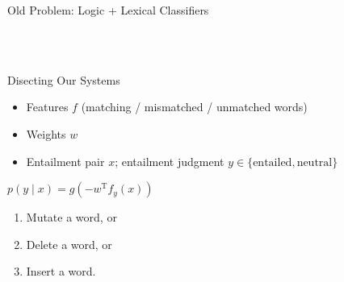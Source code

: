 \def\title{Old Problem: Logic + Lexical Classifiers}
\begin{frame}{\title}
\begin{center}
 \\
 \\
\vspace{2ex}
\end{center}
\end{frame}



\def\title{Disecting Our Systems}
\begin{frame}{\title}
\begin{itemize}
\item Features $f$ (matching / mismatched / unmatched words)
\item Weights $w$
\item Entailment pair $x$; entailment judgment $y \in \{\textrm{entailed}, \textrm{neutral}\}$
\end{itemize}

\begin{center}
$p(y \mid x) 
  = g\left(- w^{\textrm{T}} f_y(x)\right)
$
\end{center}
\pause
\vspace{1ex}

\begin{enumerate}
\item Mutate a word, or
\item Delete a word, or
\item Insert a word.
\end{enumerate}
\pause
\vspace{1ex}

\begin{center}
\end{center}
\end{frame}



